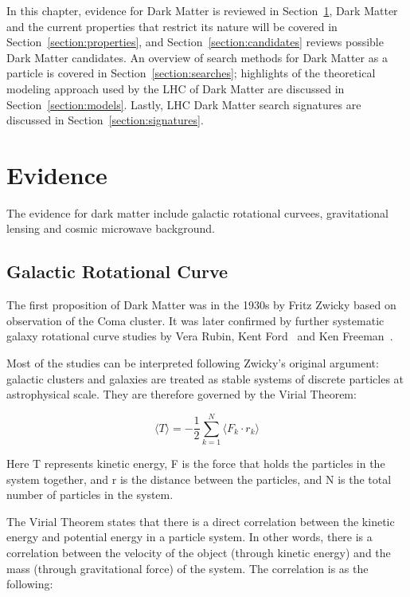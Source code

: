     In this chapter, evidence for Dark Matter is reviewed in Section~\ref{section:evidence}, Dark Matter and the current properties that restrict its nature will be covered in Section~\ref{section:properties}, and Section~\ref{section:candidates} reviews possible Dark Matter candidates. An overview of search methods for Dark Matter as a particle is covered in Section~\ref{section:searches}; highlights of the theoretical modeling approach used by the LHC of Dark Matter are discussed in Section~\ref{section:models}. Lastly, LHC Dark Matter search signatures are discussed in Section~\ref{section:signatures}.

\section{Evidence}
\label{section:evidence}

The evidence for dark matter include galactic rotational curvees, gravitational lensing and cosmic microwave background.

\subsection{Galactic Rotational Curve}
The first proposition of Dark Matter was in the 1930s by Fritz Zwicky based on observation of the Coma cluster. It was later confirmed by further systematic galaxy rotational curve studies by Vera Rubin, Kent Ford~\cite{Rubin} and Ken Freeman~\cite{freeman}.  

    Most of the studies can be interpreted following Zwicky's original argument: galactic clusters and galaxies are treated as stable systems of discrete particles at astrophysical scale. They are therefore governed by the Virial Theorem:

\begin{equation}
     \langle T \rangle = -\frac{1}{2} \sum_{k=1}^{N} \langle F_{k} \cdot r_{k} \rangle
    \label{eq:virial}
\end{equation}

Here T represents kinetic energy, F is the force that holds the particles in the system together, and r is the distance between the particles, and N is the total number of particles in the system. 

    The Virial Theorem states that there is a direct correlation between the kinetic energy and potential energy in a particle system. In other words, there is a correlation between the velocity of the object (through kinetic energy) and the mass (through gravitational force) of the system. 
    The correlation is as the following:
    
